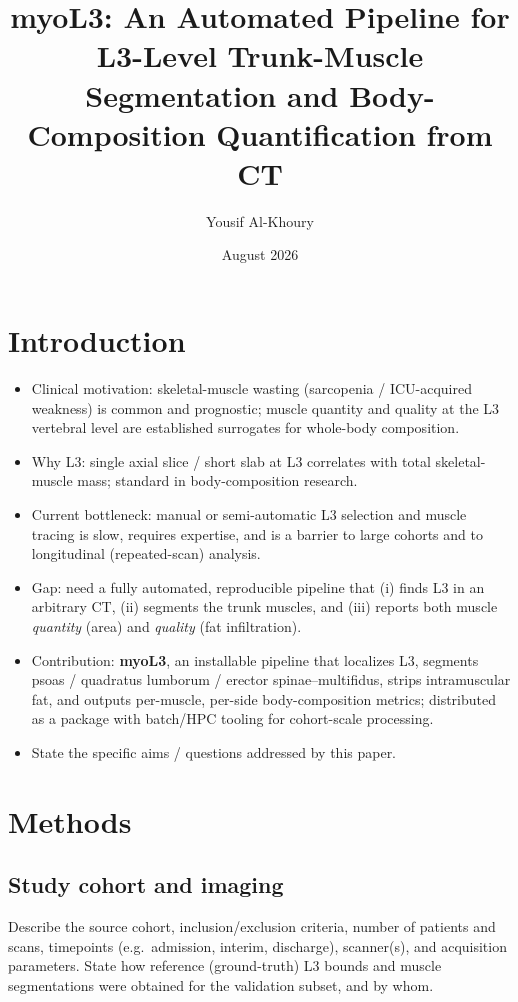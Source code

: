 \documentclass{article}
\title{myoL3: An Automated Pipeline for L3-Level Trunk-Muscle
Segmentation and Body-Composition Quantification from CT}
\author{Yousif Al-Khoury}
\date{August 2026}
\begin{document}
\maketitle

\section{Introduction}
\begin{itemize}
  \item Clinical motivation: skeletal-muscle wasting (sarcopenia / ICU-acquired
        weakness) is common and prognostic; muscle quantity and quality at the
        L3 vertebral level are established surrogates for whole-body composition.
  \item Why L3: single axial slice / short slab at L3 correlates with total
        skeletal-muscle mass; standard in body-composition research.
  \item Current bottleneck: manual or semi-automatic L3 selection and muscle
        tracing is slow, requires expertise, and is a barrier to large cohorts
        and to longitudinal (repeated-scan) analysis.
  \item Gap: need a fully automated, reproducible pipeline that (i) finds L3 in
        an arbitrary CT, (ii) segments the trunk muscles, and (iii) reports both
        muscle \emph{quantity} (area) and \emph{quality} (fat infiltration).
  \item Contribution: \textbf{myoL3}, an installable pipeline that localizes L3,
        segments psoas / quadratus lumborum / erector spinae--multifidus,
        strips intramuscular fat, and outputs per-muscle, per-side
        body-composition metrics; distributed as a package with batch/HPC
        tooling for cohort-scale processing.
  \item State the specific aims / questions addressed by this paper.
\end{itemize}

\section{Methods}

\subsection{Study cohort and imaging}
Describe the source cohort, inclusion/exclusion criteria, number of patients
and scans, timepoints (e.g.\ admission, interim, discharge), scanner(s), and
acquisition parameters. State how reference (ground-truth) L3 bounds and muscle
segmentations were obtained for the validation subset, and by whom.
\end{document}
